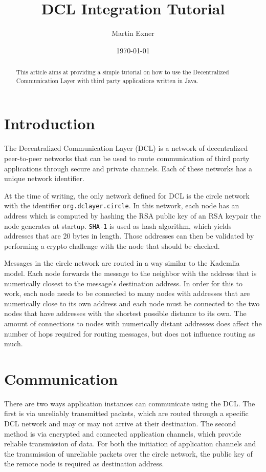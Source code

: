 \documentclass[a4paper,twoside,twocolumn,DIV=12,BCOR=1cm]{scrartcl}
\title{DCL Integration Tutorial}
\author{Martin Exner}
\date{\today}
\newcommand{\code}[1]{\texttt{#1}}
\begin{document}
\maketitle

\begin{abstract}
This article aims at providing a simple tutorial on how to use the
Decentralized Communication Layer with third party applications written
in Java.
\end{abstract}

\section*{Introduction}
The Decentralized Communication Layer (DCL) is a network of decentralized
peer-to-peer networks that can be used to route communication of third party
applications through secure and private channels. Each of these networks has a
unique network identifier.

At the time of writing, the only network defined for DCL is the circle network
with the identifier \code{org.dclayer.circle}. In this network, each node has
an address which is computed by hashing the RSA public key of an RSA keypair
the node generates at startup. \code{SHA-1} is used as hash algorithm, which
yields addresses that are 20 bytes in length. Those addresses can then be
validated by performing a crypto challenge with the node that should be checked.

Messages in the circle network are routed in a way similar to the Kademlia
model. Each node forwards the message to the neighbor with the address that is
numerically closest to the message's destination address. In order for this to
work, each node needs to be connected to many nodes with addresses that are
numerically close to its own address and each node must be connected to the two
nodes that have addresses with the shortest possible distance to its own. The
amount of connections to nodes with numerically distant addresses does affect
the number of hops required for routing messages, but does not influence routing
as much.

\section*{Communication}
There are two ways application instances can communicate using the DCL.
The first is via unreliably transmitted packets, which are routed through a
specific DCL network and may or may not arrive at their destination.
The second method is via encrypted and connected application channels, which
provide reliable transmission of data. For both the initiation of application
channels and the transmission of unreliable packets over the circle network, the
public key of the remote node is required as destination address.
\end{document}
